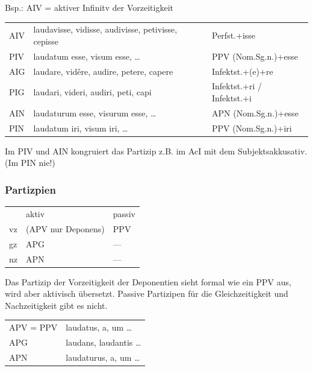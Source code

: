 \documentclass{scrartcl}
\begin{document}
Bsp.: AIV = aktiver Infinitv der Vorzeitigkeit


\begin{center}
\begin{tabular}{lll}
AIV & laudavisse, vidisse, audivisse, petivisse, cepisse & Perfst.+isse\\
PIV & laudatum esse, visum esse, \ldots{} & PPV (Nom.Sg.n.)+esse\\
AIG & laudare, vidêre, audire, petere, capere & Infektst.+(e)+re\\
PIG & laudari, videri, audiri, peti, capi & Infektst.+ri / Infektst.+i\\
AIN & laudaturum esse, visurum esse, \ldots{} & APN (Nom.Sg.n.)+esse\\
PIN & laudatum iri, visum iri, \ldots{} & PPV (Nom.Sg.n.)+iri\\
\end{tabular}
\end{center}


Im PIV und AIN kongruiert das Partizip z.B. im AcI mit dem Subjektsakkusativ. (Im PIN nie!)



\subsubsection{Partizpien}
\label{sec:org874782d}

\begin{center}
\begin{tabular}{lll}
 & aktiv & passiv\\
vz & (APV nur Deponens) & PPV\\
gz & APG & ---\\
nz & APN & ---\\
\end{tabular}
\end{center}

Das Partizip der Vorzeitigkeit der Deponentien sieht formal wie ein PPV aus, wird aber aktivisch übersetzt. Passive Partizipen für die Gleichzeitigkeit und Nachzeitigkeit gibt es nicht.

\begin{center}
\begin{tabular}{ll}
APV = PPV & laudatus, a, um \ldots{}\\
APG & laudans, laudantis \ldots{}\\
APN & laudaturus, a, um \ldots{}\\
\end{tabular}
\end{center}
\end{document}
